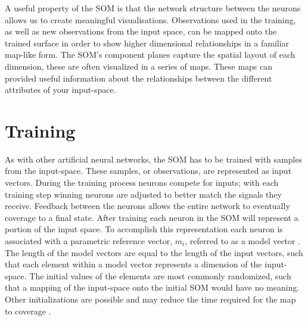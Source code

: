 A useful property of the SOM is that the network structure between the neurons
allows us to create meaningful visualisations.  Observations used in the
training, as well as new observations from the input space,  can be mapped
onto the trained surface in order to show higher dimensional relationships in a
familiar map-like form. The SOM's component planes capture the spatial layout
of each dimension, these are often visualized in a series of maps.  These
maps can provided useful information about the relationships between the
different attributes of your input-space.

\section{Training}
As with other artificial neural networks, the SOM has to be trained with
samples from the input-space.  These samples, or observations, are represented
as input vectors.  During the training process neurons compete for inputs;
with each training step winning neurons are adjusted to better match the
signals they receive.  Feedback between the neurons allows the entire network to
eventually coverage to a final state. After training each neuron in the SOM
will represent a portion of the input space.  To accomplish this
representation each neuron is associated with a parametric reference vector,
\(m_i\), referred to as a model vector \cite{Kohonen2000}.  The length of the
model vectors are equal to the length of the input vectors, such that each
element within a model vector represents a dimension of the input-space.  The
initial values of the elements are most commonly randomized, such that a
mapping of the input-space onto the initial SOM would have no meaning. Other
initializations are possible and may reduce the time required for the map to
coverage \cite{Kohonen2000}.

